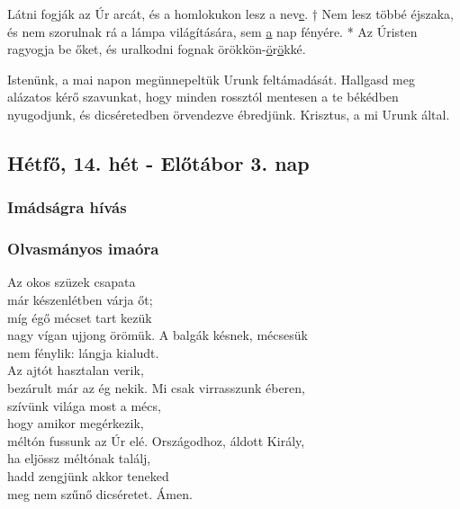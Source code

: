 \documentclass[twoside]{article}
\begin{document}
Látni fogják az Úr arcát, és a homlokukon lesz a nev\underline{e}. † Nem lesz többé éjszaka, és nem
szorulnak rá a lámpa világítására, sem \underline{a} nap fényére. * Az Úristen ragyogja be őket, és
uralkodni fognak örökkön-\underline{ö}r\underline{ö}kké.

Istenünk, a mai napon megünnepeltük Urunk feltámadását. Hallgasd meg alázatos kérő szavunkat, hogy
minden rossztól mentesen a te békédben nyugodjunk, és dicséretedben örvendezve ébredjünk. Krisztus,
a mi Urunk által.

\subsection*{Hétfő, 14. hét - Előtábor 3. nap}

\label{f2/Inv}

\subsubsection*{Imádságra hívás}



\subsubsection*{Olvasmányos imaóra}



\begin{hymnstanzas}
    Az okos szüzek csapata\\
    már készenlétben várja őt;\\
    míg égő mécset tart kezük\\
    nagy vígan ujjong örömük.
\stanzabreak
    A balgák késnek, mécsesük\\
    nem fénylik: lángja kialudt.\\
    Az ajtót hasztalan verik,\\
    bezárult már az ég nekik.
\stanzabreak
    Mi csak virrasszunk éberen,\\
    szívünk világa most a mécs,\\
    hogy amikor megérkezik,\\
    méltón fussunk az Úr elé.
\stanzabreak
    Országodhoz, áldott Király,\\
    ha eljössz méltónak találj,\\
    hadd zengjünk akkor teneked\\
    meg nem szűnő dicséretet. Ámen.
\end{hymnstanzas}
\end{document}
